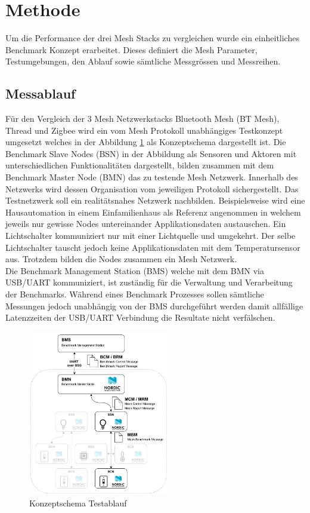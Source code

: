 \section{Methode}
Um die Performance der drei Mesh Stacks zu vergleichen wurde ein einheitliches Benchmark Konzept erarbeitet. Dieses definiert die Mesh Parameter, Testumgebungen, den Ablauf sowie sämtliche Messgrössen und Messreihen.

\subsection{Messablauf}
Für den Vergleich der 3 Mesh Netzwerkstacks Bluetooth Mesh (BT Mesh), Thread und Zigbee wird ein vom Mesh Protokoll unabhängiges Testkonzept umgesetzt welches in der Abbildung \ref{fig:KonzeptschemaTestablauf} als Konzeptschema dargestellt ist. Die Benchmark Slave Nodes (BSN) in der Abbildung als Sensoren und Aktoren mit unterschiedlichen Funktionalitäten dargestellt, bilden zusammen mit dem Benchmark Master Node (BMN) das zu testende Mesh Netzwerk. Innerhalb des Netzwerks wird dessen Organisation vom jeweiligen Protokoll sichergestellt. Das Testnetzwerk soll ein realitätsnahes Netzwerk nachbilden. Beispielsweise wird eine Hausautomation in einem Einfamilienhaus als Referenz angenommen in welchem jeweils nur gewisse Nodes untereinander Applikationsdaten austauschen. Ein Lichtschalter kommuniziert nur mit einer Lichtquelle und umgekehrt. Der selbe Lichtschalter tauscht jedoch keine Applikationsdaten mit dem Temperatursensor aus. Trotzdem bilden die Nodes zusammen ein Mesh Netzwerk.\\

Die Benchmark Management Station (BMS) welche mit dem BMN via USB/UART kommuniziert, ist zuständig für die Verwaltung und Verarbeitung der Benchmarks. Während eines Benchmark Prozesses sollen sämtliche Messungen jedoch unabhängig von der BMS durchgeführt werden damit allfällige Latenzzeiten der USB/UART Verbindung die Resultate nicht verfälschen.

\begin{figure}[h]
	\centering
	\includegraphics[width=0.55\textwidth]{graphics/Mesh_Testkonzeptschema.png}
	\caption{Konzeptschema Testablauf}
	\label{fig:KonzeptschemaTestablauf}
\end{figure}

